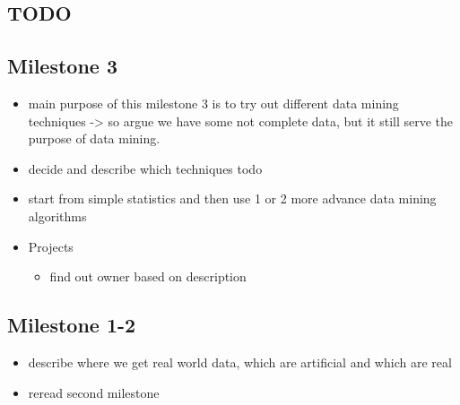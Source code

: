 \subsection{TODO} %
\label{sub:TODO}

\subsection{Milestone 3} %
\label{sub:Milestone 3}
\begin{itemize}
    \item main purpose of this milestone 3 is to try out different data mining techniques -> so argue we have some not complete data, but it still serve the purpose of data mining.
    \item decide and describe which techniques todo
    \item start from simple statistics and then use 1 or 2 more advance data mining algorithms
    \item Projects
        \begin{itemize}
            \item find out owner based on description 
        \end{itemize}
\end{itemize}


\subsection{Milestone 1-2} %
\label{sub:Milestone 1-2}

\begin{itemize}
    \item describe where we get real world data, which are artificial and which are real
    \item reread second milestone
\end{itemize}

